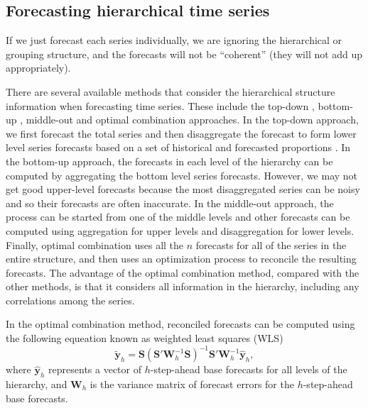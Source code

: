 \documentclass[11pt,a4paper,]{article}
\begin{document}
\hypertarget{forecasting-hierarchical-time-series}{%
\subsection{Forecasting hierarchical time
series}\label{forecasting-hierarchical-time-series}}

If we just forecast each series individually, we are ignoring the
hierarchical or grouping structure, and the forecasts will not be
``coherent'' (they will not add up appropriately).

There are several available methods that consider the hierarchical
structure information when forecasting time series. These include the
top-down \autocite{gross1990disaggregation,fliedner2001hierarchical},
bottom-up \autocite{kahn1998revisiting}, middle-out and optimal
combination \autocite{hyndman2011optimal} approaches. In the top-down
approach, we first forecast the total series and then disaggregate the
forecast to form lower level series forecasts based on a set of
historical and forecasted proportions \autocite[for details
see][]{athanasopoulos2009hierarchical}. In the bottom-up approach, the
forecasts in each level of the hierarchy can be computed by aggregating
the bottom level series forecasts. However, we may not get good
upper-level forecasts because the most disaggregated series can be noisy
and so their forecasts are often inaccurate. In the middle-out approach,
the process can be started from one of the middle levels and other
forecasts can be computed using aggregation for upper levels and
disaggregation for lower levels. Finally, optimal combination uses all
the \(n\) forecasts for all of the series in the entire structure, and
then uses an optimization process to reconcile the resulting forecasts.
The advantage of the optimal combination method, compared with the other
methods, is that it considers all information in the hierarchy,
including any correlations among the series.

In the optimal combination method, reconciled forecasts can be computed
using the following equeation known as weighted least squares (WLS)
\autocite{mint2018} \begin{equation}\label{eq:mint}
  \tilde{\bm{y}}_{h}=\bm{S}(\bm{S}'\bm{W}_h^{-1}\bm{S})^{-1}\bm{S}'\bm{W}_h^{-1}\hat{\bm{y}}_h,
\end{equation} where \(\hat{\bm{y}}_h\) represents a vector of
\(h\)-step-ahead base forecasts for all levels of the hierarchy, and
\(\bm{W}_h\) is the variance matrix of forecast errors for the
\(h\)-step-ahead base forecasts.
\end{document}
